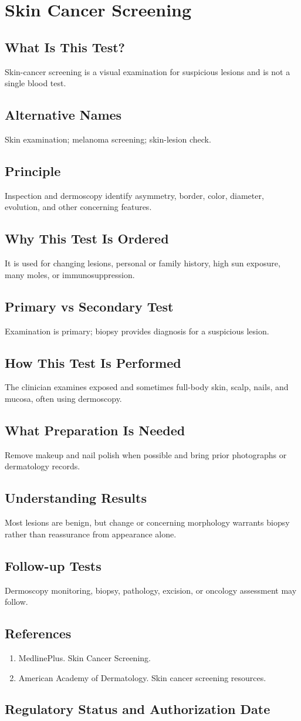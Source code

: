 \chapter{Skin Cancer Screening}
\section*{What Is This Test?} Skin-cancer screening is a visual examination for suspicious lesions and is not a single blood test.\section*{Alternative Names} Skin examination; melanoma screening; skin-lesion check.\section*{Principle} Inspection and dermoscopy identify asymmetry, border, color, diameter, evolution, and other concerning features.\section*{Why This Test Is Ordered} It is used for changing lesions, personal or family history, high sun exposure, many moles, or immunosuppression.\section*{Primary vs Secondary Test} Examination is primary; biopsy provides diagnosis for a suspicious lesion.\section*{How This Test Is Performed} The clinician examines exposed and sometimes full-body skin, scalp, nails, and mucosa, often using dermoscopy.\section*{What Preparation Is Needed} Remove makeup and nail polish when possible and bring prior photographs or dermatology records.\section*{Understanding Results} Most lesions are benign, but change or concerning morphology warrants biopsy rather than reassurance from appearance alone.\section*{Follow-up Tests} Dermoscopy monitoring, biopsy, pathology, excision, or oncology assessment may follow.\section*{References} \begin{enumerate}\item MedlinePlus. Skin Cancer Screening.\item American Academy of Dermatology. Skin cancer screening resources.\end{enumerate}\clearpage\section*{Regulatory Status and Authorization Date}\clearpage
